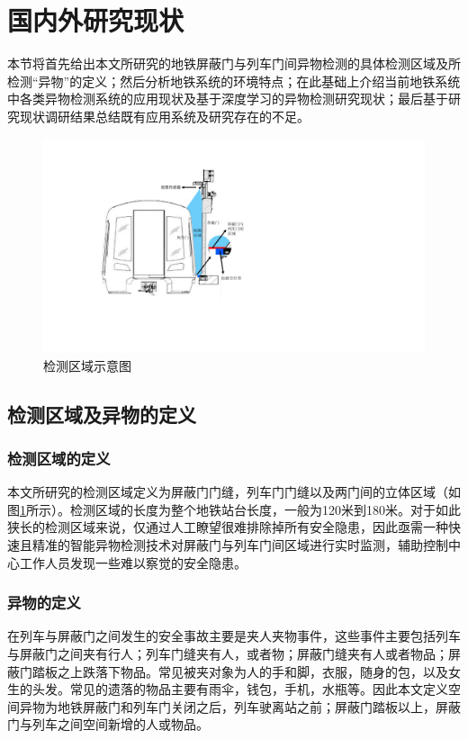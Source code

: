 \section{国内外研究现状}
本节将首先给出本文所研究的地铁屏蔽门与列车门间异物检测的具体检测区域及所检测“异物”的定义；然后分析地铁系统的环境特点；在此基础上介绍当前地铁系统中各类异物检测系统的应用现状及基于深度学习的异物检测研究现状；最后基于研究现状调研结果总结既有应用系统及研究存在的不足。
\begin{figure}[b!]
	\centering
	\includegraphics[scale=0.8]{Fig/检测区域.pdf}
	\caption{\label{检测区域}检测区域示意图}
\end{figure}
\subsection{检测区域及异物的定义}
\subsubsection*{检测区域的定义}
本文所研究的检测区域定义为屏蔽门门缝，列车门门缝以及两门间的立体区域（如图\ref{检测区域}所示）。检测区域的长度为整个地铁站台长度，一般为120米到180米。对于如此狭长的检测区域来说，仅通过人工瞭望很难排除掉所有安全隐患，因此亟需一种快速且精准的智能异物检测技术对屏蔽门与列车门间区域进行实时监测，辅助控制中心工作人员发现一些难以察觉的安全隐患。
\subsubsection*{异物的定义}
在列车与屏蔽门之间发生的安全事故主要是夹人夹物事件，这些事件主要包括列车与屏蔽门之间夹有行人；列车门缝夹有人，或者物；屏蔽门缝夹有人或者物品；屏蔽门踏板之上跌落下物品。常见被夹对象为人的手和脚，衣服，随身的包，以及女生的头发。常见的遗落的物品主要有雨伞，钱包，手机，水瓶等。因此本文定义空间异物为地铁屏蔽门和列车门关闭之后，列车驶离站之前；屏蔽门踏板以上，屏蔽门与列车之间空间新增的人或物品。
